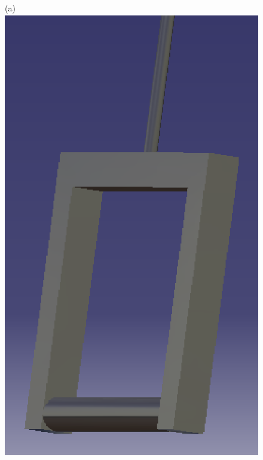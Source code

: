      \begin{figure}[!htbp]
     	\begin{center}
     		(a)\includegraphics[height=.3\textheight]{figuras/direcao2.eps}

\end{center}
\end{figure}
